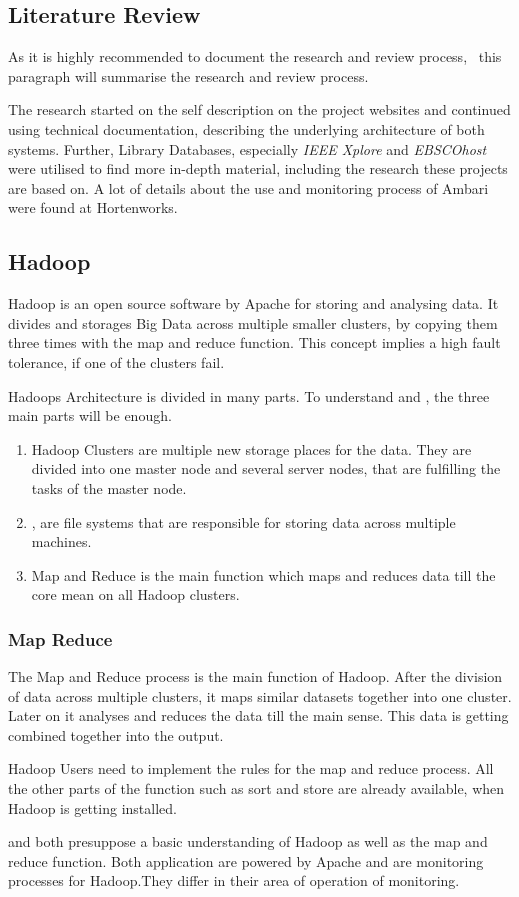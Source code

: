 \subsection{Literature Review}
As it is highly recommended to document the research and review process,~\cite{brocke09} this paragraph will summarise the research and review process.

The research started on the self description on the project websites and continued using technical documentation, describing the underlying architecture of both systems.
Further, Library Databases, especially \emph{IEEE Xplore} and \emph{EBSCOhost} were utilised to find more in-depth material, including the research these projects are based on. A lot of details about the use and monitoring process of Ambari were found at Hortenworks.
	
\subsection{Hadoop}
\label{subsec:Hadoop}
Hadoop is an open source software by Apache for storing and analysing data.\cite{Dagli2014} It divides and storages Big Data across multiple smaller clusters, by copying them three times with the map and reduce function. This concept implies a high fault tolerance, if one of the clusters fail.\cite{Dagli2014}

Hadoops Architecture is divided in many parts. To understand \amb and \chuk, the three main parts will be enough.\cite{Dagli2014}
  \begin{enumerate}
  	\item Hadoop Clusters are multiple new storage places for the data. They are divided into one master node and several server nodes, that are fulfilling the tasks of the master node.\cite{Dagli2014}
  	\item \hdfs, are file systems that are responsible for storing data across multiple machines.\cite{Dagli2014}
  	\item Map and Reduce is the main function which maps and reduces data till the core mean on all Hadoop clusters.\cite{Dagli2014}
  \end{enumerate}

\subsubsection*{Map Reduce}
The Map and Reduce process is the main function of Hadoop. After the division of data across multiple clusters, it maps similar datasets together into one cluster. 
Later on it analyses and reduces the data till the main sense. This data is getting combined together into the output. \cite{Dagli2014}

Hadoop Users need to implement the rules for the map and reduce process. All the other parts of the function such as sort and store are already available, when Hadoop is getting installed.\cite{Dagli2014}


\amb and \chuk both presuppose a basic understanding of Hadoop as well as the map and reduce function. Both application are powered by Apache and are monitoring processes for Hadoop.They differ in their area of operation of monitoring.\cite{ApacheSoftwareFoundation2015}